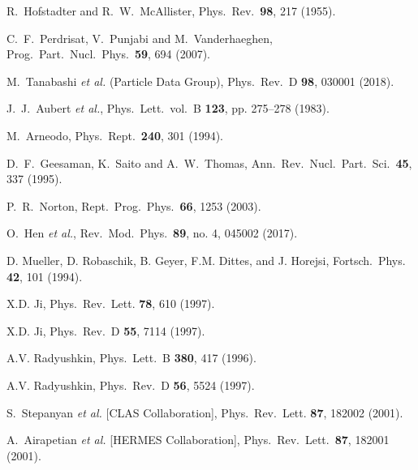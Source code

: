\documentclass[twocolumn,nofootinbib,showpacs,prl,superscriptaddress,secnumarabic,amssymb,nobibnotes,aps,floatfix]{revtex4}
\begin{document}
\begin{thebibliography}{99}

 R.~Hofstadter and R.~W.~McAllister,
Phys.\ Rev.\  {\bf 98}, 217 (1955).

 C.~F.~Perdrisat, V.~Punjabi and M.~Vanderhaeghen,
Prog.\ Part.\ Nucl.\ Phys.\  {\bf 59}, 694 (2007).

 M.~Tanabashi {\it et al.} (Particle Data Group), Phys.\ Rev.\ D 
   {\bf 98}, 030001 (2018).

   J.~J.~Aubert {\it et al.}, 
      Phys.\ Lett.\, vol.\ B { \bf 123}, pp. 275–278 (1983).

  M.~Arneodo,
  Phys.\ Rept.\  {\bf 240}, 301 (1994).

  D.~F.~Geesaman, K.~Saito and A.~W.~Thomas,
  Ann.\ Rev.\ Nucl.\ Part.\ Sci.\  {\bf 45}, 337 (1995).

  P.~R.~Norton,
  Rept.\ Prog.\ Phys.\  {\bf 66}, 1253 (2003).

  O.~Hen {\it et al.},
  Rev.\ Mod.\ Phys.\  {\bf 89}, no. 4, 045002 (2017).

 D. Mueller, D. Robaschik, B. Geyer, F.M. Dittes, and 
   J.  Horejsi,
Fortsch.\ Phys. {\bf 42}, 101 (1994).
  
X.D. Ji,
Phys.\ Rev.\ Lett. {\bf 78}, 610 (1997).

X.D. Ji,
Phys.\ Rev.\ D {\bf 55}, 7114 (1997).

A.V. Radyushkin,
Phys.\ Lett.\  B {\bf 380}, 417 (1996).

A.V. Radyushkin,
Phys.\ Rev.\ D {\bf 56}, 5524 (1997).

S.~Stepanyan {\it et al.} [CLAS Collaboration],
Phys.\ Rev.\ Lett. {\bf 87}, 182002 (2001).

 A.~Airapetian {\it et al.} [HERMES Collaboration],
 Phys.\ Rev.\ Lett.\  {\bf 87}, 182001 (2001).


\end{thebibliography}
\end{document}
